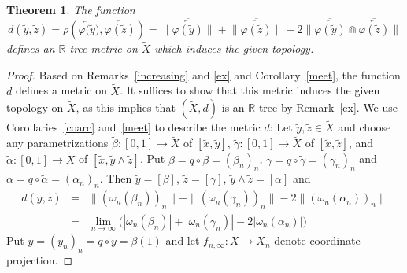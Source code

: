\documentclass{amsart}
\newtheorem{theorem}{Theorem}[section]
\theoremstyle{definition}
\theoremstyle{remark}
\numberwithin{equation}{section}
\begin{document}
\begin{theorem}\label{tree}
 The function \[d(\tilde{y},\tilde{z})=\rho\left(\overleftarrow{\varphi(\tilde{y}}),\overleftarrow{\varphi(\tilde{z})}\right)
 =\Big\|\overline{\overleftarrow{\varphi(\tilde{y})}}\Big\|+\Big\|\overline{\overleftarrow{\varphi(\tilde{z})}}\Big\|
 -2\Big\|\overline{\overleftarrow{\varphi(\tilde{y})}}\Cap\overline{\overleftarrow{\varphi(\tilde{z})}}\Big\|\] defines an $\mathbb{R}$-tree metric on $\tilde{X}$ which induces the given topology.
\end{theorem}

\begin{proof}

Based on  Remarks~\ref{increasing} and \ref{ex} and Corollary~\ref{meet}, the function  $d$ defines a metric on $\tilde{X}$.  It suffices to show that this metric induces the given topology on $\tilde{X}$, as this implies that $(\tilde{X},d)$ is an $\mathbb{R}$-tree by Remark~\ref{ex}. We use Corollaries~\ref{coarc} and~\ref{meet} to describe the metric $d$:
 Let $\tilde{y},\tilde{z}\in \tilde{X}$ and choose any parametrizations $\tilde{\beta}:[0,1]\rightarrow \tilde{X}$ of $[\tilde{x},\tilde{y}]$,  $\tilde{\gamma}:[0,1]\rightarrow \tilde{X}$  of $[\tilde{x},\tilde{z}]$, and  $\tilde{\alpha}:[0,1]\rightarrow \tilde{X}$ of $[\tilde{x},\tilde{y}\wedge\tilde{z}]$.
 Put  $\beta=q\circ \tilde{\beta}=(\beta_n)_n$, $\gamma=q\circ \tilde{\gamma}=(\gamma_n)_n$ and $\alpha=q\circ \tilde{\alpha}=(\alpha_n)_n$.
 Then $\tilde{y}=[\beta]$,  $\tilde{z}=[\gamma]$, $\tilde{y}\wedge \tilde{z}=[\alpha]$ and \begin{eqnarray*} d(\tilde{y},\tilde{z})&=&\|(\omega_n(\beta_n))_n\|+\|(\omega_n(\gamma_n))_n\|-2\|(\omega_n(\alpha_n))_n\|\\
 &=&\lim_{n\rightarrow \infty}\Big( |\omega_n(\beta_n)|+|\omega_n(\gamma_n)|-2|\omega_n(\alpha_n)|\Big)
 \end{eqnarray*}
Put $y=(y_n)_n=q\circ\tilde{y}=\beta(1)$ and let $f_{n,\infty}:X\rightarrow X_n$ denote coordinate projection.


\end{proof}
\end{document}
